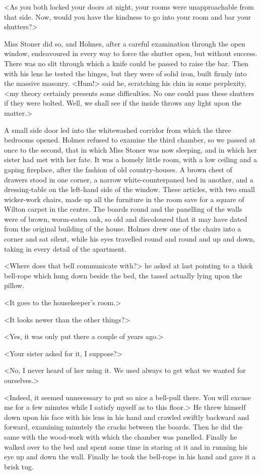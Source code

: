 <As you both locked your doors at night, your rooms were unapproachable from that side. Now, would you have the kindness to go into your room and bar your shutters?>

Miss Stoner did so, and Holmes, after a careful examination through the open window, endeavoured in every way to force the shutter open, but without success. There was no slit through which a knife could be passed to raise the bar. Then with his lens he tested the hinges, but they were of solid iron, built firmly into the massive masonry. <Hum!> said he, scratching his chin in some perplexity, <my theory certainly presents some difficulties. No one could pass these shutters if they were bolted. Well, we shall see if the inside throws any light upon the matter.>

A small side door led into the whitewashed corridor from which the three bedrooms opened. Holmes refused to examine the third chamber, so we passed at once to the second, that in which Miss Stoner was now sleeping, and in which her sister had met with her fate. It was a homely little room, with a low ceiling and a gaping fireplace, after the fashion of old country-houses. A brown chest of drawers stood in one corner, a narrow white-counterpaned bed in another, and a dressing-table on the left-hand side of the window. These articles, with two small wicker-work chairs, made up all the furniture in the room save for a square of Wilton carpet in the centre. The boards round and the panelling of the walls were of brown, worm-eaten oak, so old and discoloured that it may have dated from the original building of the house. Holmes drew one of the chairs into a corner and sat silent, while his eyes travelled round and round and up and down, taking in every detail of the apartment.

<Where does that bell communicate with?> he asked at last pointing to a thick bell-rope which hung down beside the bed, the tassel actually lying upon the pillow.

<It goes to the housekeeper's room.>

<It looks newer than the other things?>

<Yes, it was only put there a couple of years ago.>

<Your sister asked for it, I suppose?>

<No, I never heard of her using it. We used always to get what we wanted for ourselves.>

<Indeed, it seemed unnecessary to put so nice a bell-pull there. You will excuse me for a few minutes while I satisfy myself as to this floor.> He threw himself down upon his face with his lens in his hand and crawled swiftly backward and forward, examining minutely the cracks between the boards. Then he did the same with the wood-work with which the chamber was panelled. Finally he walked over to the bed and spent some time in staring at it and in running his eye up and down the wall. Finally he took the bell-rope in his hand and gave it a brisk tug.

